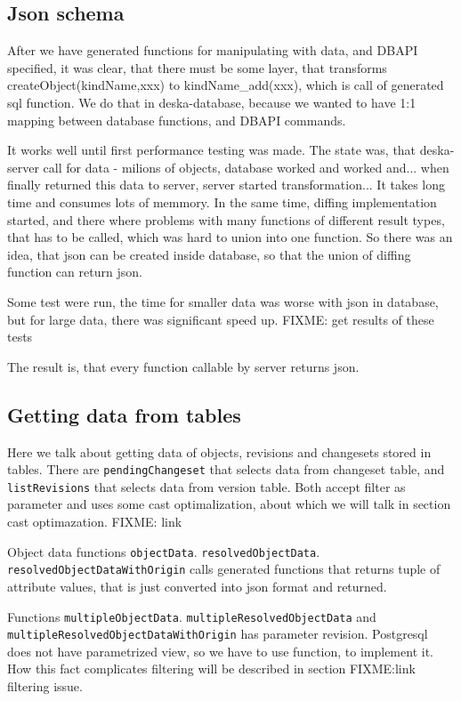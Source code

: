\documentclass[deska]{subfiles}
\begin{document}
\subsection{Json schema}
After we have generated functions for manipulating with data, and DBAPI specified, it was clear, that there must be some layer,
that transforms createObject(kindName,xxx) to kindName\_add(xxx), which is call of generated sql function.
We do that in deska-database, because we wanted to have 1:1 mapping between database functions, and DBAPI commands.

It works well until first performance testing was made. The state was, that deska-server call for data - milions of objects,
database worked and worked and... when finally returned this data to server, server started transformation... It takes long time
and consumes lots of memmory.
In the same time, diffing implementation started, and there where problems with many functions of different result types,
that has to be called, which was hard to union into one function.
So there was an idea, that json can be created inside database, so that the union of diffing function can return json.

Some test were run, the time for smaller data was worse with json in database, but for large data, there was significant
speed up.
FIXME: get results of these tests

The result is, that every function callable by server returns json.

\subsection{Getting data from tables}
Here we talk about getting data of objects, revisions and changesets stored in tables.
There are {\tt pendingChangeset} that selects data from changeset table, and {\tt listRevisions} that selects data from version table.
Both accept filter as parameter and uses some cast optimalization, about which we will talk in section cast optimazation.
FIXME: link

Object data functions {\tt objectData}. {\tt resolvedObjectData}. {\tt resolvedObjectDataWithOrigin} calls generated functions 
that returns tuple of attribute values, that is just converted into json format and returned. 

Functions {\tt multipleObjectData}. {\tt multipleResolvedObjectData} and {\tt multipleResolvedObjectDataWithOrigin} has parameter revision.
Postgresql does not have parametrized view, so we have to use function, to implement it. How this fact complicates filtering will
be described in section FIXME:link filtering issue.
\end{document}

